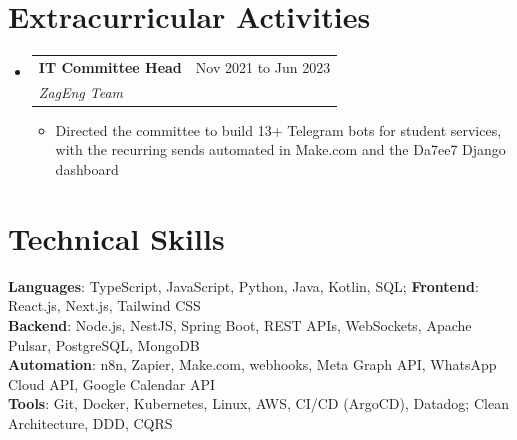 \documentclass[letterpaper,11pt]{article}
\makeatletter
\newcommand{\resumeItem}[1]{
  \item\small{
    {#1 \vspace{-3pt}}
  }
}
\newcommand{\resumeSubheading}[4]{
  \vspace{-1pt}\item
    \begin{tabular*}{0.97\textwidth}[t]{l@{\extracolsep{\fill}}r}
      \textbf{#1} & #2 \\
      \textit{\small#3} & \textit{\small #4} \\
    \end{tabular*}\vspace{-9pt}
}
\newcommand{\resumeSubHeadingListStart}{\begin{itemize}[leftmargin=0.15in, label={}]}
\newcommand{\resumeSubHeadingListEnd}{\end{itemize}}
\newcommand{\resumeItemListStart}{\begin{itemize}}
\newcommand{\resumeItemListEnd}{\end{itemize}\vspace{-7pt}}
\makeatother
\begin{document}
\section{Extracurricular Activities}
    \resumeSubHeadingListStart
      \resumeSubheading
        {IT Committee Head}{Nov 2021 to Jun 2023}
        {ZagEng Team}{}
        \resumeItemListStart
            \resumeItem{Directed the committee to build 13+ Telegram bots for student services, with the recurring sends automated in Make.com and the Da7ee7 Django dashboard}
            \resumeItemListEnd
    \resumeSubHeadingListEnd


\section{Technical Skills}

    \begin{itemize}[leftmargin=0.15in, label={}]
        \small{\item{
        
        \textbf{Languages}{: TypeScript, JavaScript, Python, Java, Kotlin, SQL; \textbf{Frontend}{: React.js, Next.js, Tailwind CSS}} \\
        
        \textbf{Backend}{: Node.js, NestJS, Spring Boot, REST APIs, WebSockets, Apache Pulsar, PostgreSQL, MongoDB} \\

        \textbf{Automation}{: n8n, Zapier, Make.com, webhooks, Meta Graph API, WhatsApp Cloud API, Google Calendar API} \\
        
        \textbf{Tools}{: Git, Docker, Kubernetes, Linux, AWS, CI/CD (ArgoCD), Datadog; Clean Architecture, DDD, CQRS}
        
        }}
    \end{itemize}


\end{document}

